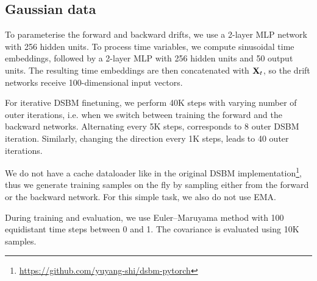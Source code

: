 \documentclass{article}
\begin{document}
\subsection{Gaussian data}


To parameterise the forward and backward drifts, we use a 2-layer MLP network with 256 hidden units. To process time variables, we compute sinusoidal time embeddings, followed by a 2-layer MLP with 256 hidden units and 50 output units. The resulting time embeddings are then concatenated with $\mathbf{X}_t$, so the drift networks receive 100-dimensional input vectors.

For iterative DSBM finetuning, we perform 40K steps with varying number of outer iterations, i.e. when we switch between training the forward and the backward networks. Alternating every 5K steps, corresponds to 8 outer DSBM iteration. Similarly, changing the direction every 1K steps, leads to 40 outer iterations.    

We do not have a cache dataloader like in the original DSBM implementation\footnote{\url{https://github.com/yuyang-shi/dsbm-pytorch}}, thus we generate training samples on the fly by sampling either from the forward or the backward network. For this simple task, we also do not use EMA.

During training and evaluation, we use Euler–Maruyama method with 100 equidistant time steps between 0 and 1. The covariance is evaluated using 10K samples. 

\end{document}
